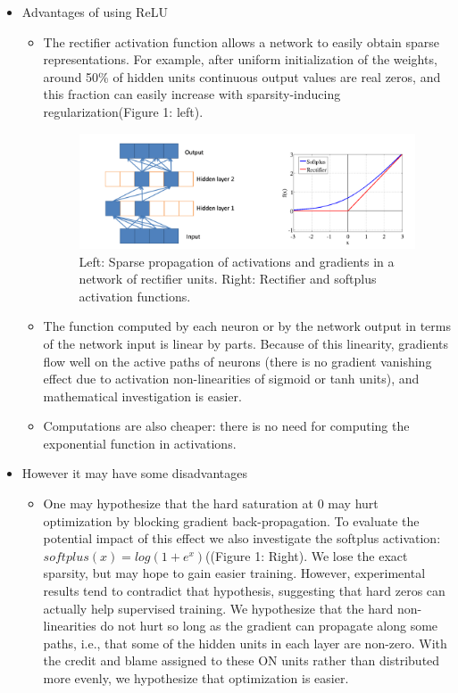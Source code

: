 \documentclass{article}
\begin{document}
\begin{itemize}
    \item Advantages of using ReLU
    \begin{itemize}
        \item The rectifier activation function allows a network to easily obtain sparse representations. For example, after uniform initialization of the weights, around 50\% of hidden units continuous output values are real zeros, and this fraction can easily increase with sparsity-inducing regularization(Figure 1: left). 
        \begin{figure}
            \centering
            \includegraphics[scale=0.4]{relu.png}
            \caption{Left: Sparse propagation of activations and gradients in a network of rectifier units. Right: Rectifier and softplus activation functions.}
            \label{fig:Figure 1}
        \end{figure}
        \item The function computed by each neuron or by the network output in terms of the network input is linear by parts. Because of this linearity, gradients flow well on the active paths of neurons (there is no gradient vanishing effect due to activation non-linearities of sigmoid or tanh units), and mathematical investigation is easier.
        \item Computations are also cheaper: there is no need for computing the exponential function in activations.
    \end{itemize}
    \item However it may have some disadvantages
    \begin{itemize}
        \item One may hypothesize that the hard saturation at 0 may hurt optimization by blocking gradient back-propagation. To evaluate the potential impact of this effect we also investigate the softplus activation: $softplus(x) = log(1+e^x)$((Figure 1: Right). We lose the exact sparsity, but may hope to gain easier training. However, experimental results tend to contradict that hypothesis, suggesting that hard zeros can actually help supervised training. We hypothesize that the hard non-linearities do not hurt so long as the gradient can propagate along some paths, i.e., that some of the hidden units in each layer are non-zero. With the credit and blame assigned to these ON units rather than distributed more evenly, we hypothesize that optimization is easier.

\end{itemize}
\end{itemize}
\end{document}

